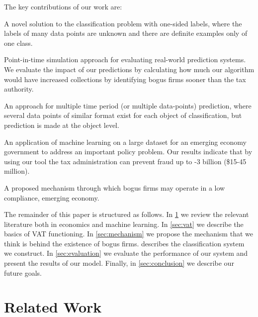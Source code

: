 The key contributions of our work are:
\begin{compactitem}
\item A novel solution to the classification problem with one-sided  labels, where the labels of many data points are unknown and there  are definite examples only of one class.
\item Point-in-time simulation approach for evaluating real-world prediction systems. We evaluate the impact of our predictions by
  calculating how much our algorithm would have increased collections by identifying bogus firms sooner than the tax authority.
\item An approach for multiple time period (or multiple data-points) prediction, where several data points of similar format exist for each object of classification, but prediction is made at the object  level.
\item An application of machine learning on a large dataset for an emerging economy government to address an important policy problem. Our results indicate that by using our tool the tax administration can prevent fraud up to -3 billion (\$15-45 million).
\item A proposed mechanism through which bogus firms may operate in a low compliance, emerging economy.
\end{compactitem}

The remainder of this paper is structured as follows. In \cref{sec:literature} we review the relevant literature both in economics and machine learning. In \cref{sec:vat} we describe the basics of VAT functioning. In \cref{sec:mechanism} we propose the mechanism that we think is behind the existence of bogus firms.  describes the classification system we construct. In \cref{sec:evaluation} we evaluate the performance of our system and present the results of our model. Finally, in \cref{sec:conclusion} we describe our future goals.


\section{Related Work}
\label{sec:literature}
